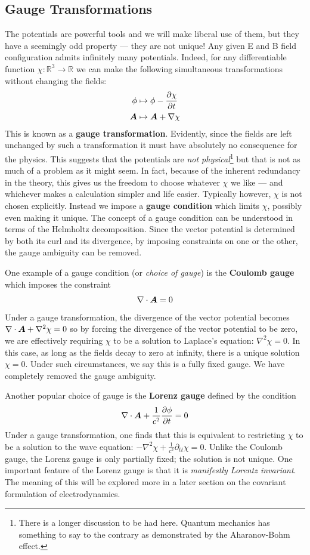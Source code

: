 \documentclass[twocolumn]{gwclass}
\newcommand{\R}{\mathbb{R}}
\begin{document}
	\subsection{Gauge Transformations}
	The potentials are powerful tools and we will make liberal use of them, but they have a seemingly odd property --- they are not unique! Any given E and B field configuration admits infinitely many potentials. Indeed, for any differentiable function $\chi:\R^3\to\R$ we can make the following simultaneous transformations without changing the fields:
	\begin{align*}
		\phi &\mapsto \phi - \frac{\partial \chi}{\partial t} \\
		\boldsymbol{A} &\mapsto \boldsymbol{A} + \nabla\chi
	\end{align*}
	This is known as a \textbf{gauge transformation}. Evidently, since the fields are left unchanged by such a transformation it must have absolutely no consequence for the physics. This suggests that the potentials are \emph{not physical}\footnote{There is a longer discussion to be had here. Quantum mechanics has something to say to the contrary as demonstrated by the Aharanov-Bohm effect.} but that is not as much of a problem as it might seem. In fact, because of the inherent redundancy in the theory, this gives us the freedom to choose whatever $\chi$ we like --- and whichever makes a calculation simpler and life easier. Typically however, $\chi$ is not chosen explicitly. Instead we impose a \textbf{gauge condition} which limits $\chi$, possibly even making it unique. The concept of a gauge condition can be understood in terms of the Helmholtz decomposition. Since the vector potential is determined by both its curl and its divergence, by imposing constraints on one or the other, the gauge ambiguity can be removed.
	
	One example of a gauge condition (or \emph{choice of gauge}) is the \textbf{Coulomb gauge} which imposes the constraint
	$$ \nabla\cdot\boldsymbol{A}=0 $$
	Under a gauge transformation, the divergence of the vector potential becomes $\nabla\cdot\boldsymbol{A} + \nabla^2\chi = 0$ so by forcing the divergence of the vector potential to be zero, we are effectively requiring $\chi$ to be a solution to Laplace's equation: $\nabla^2\chi=0$. In this case, as long as the fields decay to zero at infinity, there is a unique solution $\chi=0$. Under such circumstances, we say this is a fully fixed gauge. We have completely removed the gauge ambiguity. 
	
	Another popular choice of gauge is the \textbf{Lorenz gauge} defined by the condition
	$$ \nabla\cdot\boldsymbol{A} + \frac{1}{c^2}\frac{\partial \phi}{\partial t} = 0 $$
	Under a gauge transformation, one finds that this is equivalent to restricting $\chi$ to be a solution to the wave equation: $- \nabla^2\chi+\frac{1}{c^2}\partial_{tt}\chi  = 0$. Unlike the Coulomb gauge, the Lorenz gauge is only partially fixed; the solution is not unique. One important feature of the Lorenz gauge is that it is \emph{manifestly Lorentz invariant}. The meaning of this will be explored more in a later section on the covariant formulation of electrodynamics.
	
\end{document}
